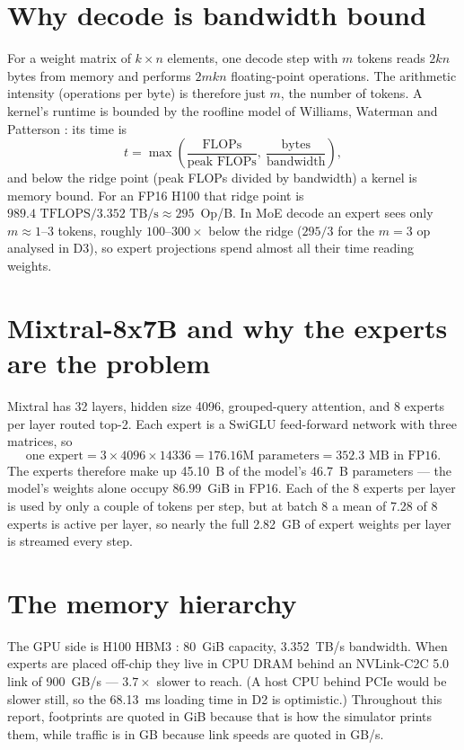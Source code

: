 \documentclass[11pt,a4paper]{report}
\begin{document}
\section{Why decode is bandwidth bound}

For a weight matrix of $k \times n$ elements, one decode step with $m$ tokens reads $2kn$ bytes from memory and performs $2mkn$ floating-point operations. The arithmetic intensity (operations per byte) is therefore just $m$, the number of tokens. A kernel's runtime is bounded by the roofline model of Williams, Waterman and Patterson \cite{roofline}: its time is
\begin{equation}
t = \max\left(\frac{\text{FLOPs}}{\text{peak FLOPs}},\ \frac{\text{bytes}}{\text{bandwidth}}\right),
\end{equation}
and below the ridge point (peak FLOPs divided by bandwidth) a kernel is memory bound. For an FP16 H100 that ridge point is $989.4\text{ TFLOPS} / 3.352\text{ TB/s} \approx 295$~Op/B. In MoE decode an expert sees only $m \approx 1$--$3$ tokens, roughly $100$--$300\times$ below the ridge ($295/3$ for the $m{=}3$ op analysed in D3), so expert projections spend almost all their time reading weights.

\section{Mixtral-8x7B and why the experts are the problem}

Mixtral \cite{mixtral} has 32 layers, hidden size 4096, grouped-query attention, and 8 experts per layer routed top-2. Each expert is a SwiGLU feed-forward network with three matrices, so
\begin{equation}
\text{one expert} = 3 \times 4096 \times 14336 = 176.16\text{M parameters} = 352.3\text{ MB in FP16}.
\end{equation}
The experts therefore make up 45.10~B of the model's 46.7~B parameters --- the model's weights alone occupy $86.99$~GiB in FP16. Each of the 8 experts per layer is used by only a couple of tokens per step, but at batch 8 a mean of 7.28 of 8 experts is active per layer, so nearly the full 2.82~GB of expert weights per layer is streamed every step.

\section{The memory hierarchy}

The GPU side is H100 HBM3 \cite{h100}: 80~GiB capacity, 3.352~TB/s bandwidth. When experts are placed off-chip they live in CPU DRAM behind an NVLink-C2C 5.0 link of 900~GB/s --- $3.7\times$ slower to reach. (A host CPU behind PCIe would be slower still, so the 68.13~ms loading time in D2 is optimistic.) Throughout this report, footprints are quoted in GiB because that is how the simulator prints them, while traffic is in GB because link speeds are quoted in GB/s.
\end{document}
